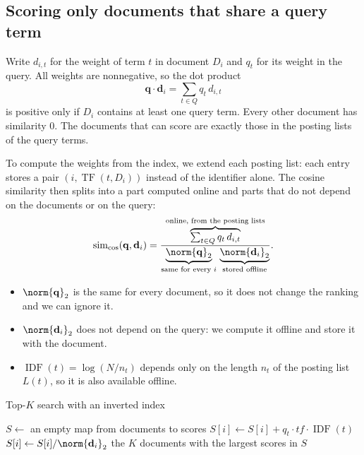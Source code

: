 \documentclass[a4paper,12pt,oneside]{report}
\begin{document}
\subsection{Scoring only documents that share a query term}

Write $d_{i,t}$ for the weight of term $t$ in document $D_i$ and $q_t$
for its weight in the query. All weights are nonnegative, so the dot
product
\[
  \mathbf q\cdot\mathbf d_i=\sum_{t\in Q}q_t\,d_{i,t}
\]
is positive only if $D_i$ contains at least one query term. Every other
document has similarity $0$. The documents that can score are exactly
those in the posting lists of the query terms.

To compute the weights from the index, we extend each posting list:
each entry stores a pair $(i,\operatorname{TF}(t,D_i))$ instead of the
identifier alone. The cosine similarity then splits into a part
computed online and parts that do not depend on the documents or on
the query:
\[
  \operatorname{sim}_{\cos}(\mathbf q,\mathbf d_i)
  =\frac{\overbrace{\textstyle\sum_{t\in Q}q_t\,d_{i,t}}^{\text{online,
      from the posting lists}}}
    {\underbrace{\norm{\mathbf q}_2}_{\text{same for every }i}\,
     \underbrace{\norm{\mathbf d_i}_2}_{\text{stored offline}}}.
\]
\begin{itemize}
  \item $\norm{\mathbf q}_2$ is the same for every document, so it does
    not change the ranking and we can ignore it.
  \item $\norm{\mathbf d_i}_2$ does not depend on the query: we compute
    it offline and store it with the document.
  \item $\operatorname{IDF}(t)=\log(N/n_t)$ depends only on the length
    $n_t$ of the posting list $L(t)$, so it is also available offline.
\end{itemize}

\begin{framedalgo}{Top-$K$ search with an inverted index}\label{alg:ranked-index}
\begin{algorithmic}[1]
    \State $S\gets$ an empty map from documents to scores
        \State $S[i]\gets S[i]+q_t\cdot\mathit{tf}\cdot\operatorname{IDF}(t)$
      \EndFor
    \EndFor
      \State $S[i]\gets S[i]/\norm{\mathbf d_i}_2$ 
    \EndFor
    \State \Return the $K$ documents with the largest scores in $S$
  \EndFunction
\end{algorithmic}
\end{framedalgo}
\end{document}
